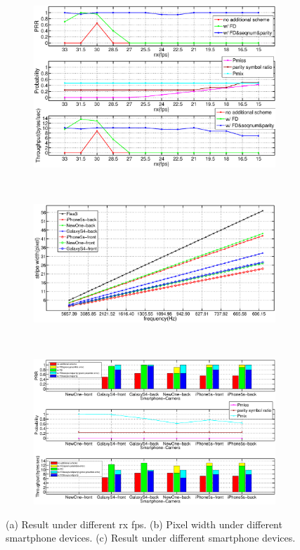 \begin{figure}[!t]
	\begin{subfigure}[h]{0.3\textwidth}
	  \includegraphics[width=\textwidth]{fig/exp1_new.eps}
	  \caption{}
	  \label{fig:exp1_1}
	\end{subfigure}
	~
	\begin{subfigure}[h]{0.35\textwidth}
	  \includegraphics[width=\textwidth]{fig/exp2_tr_new.eps}
	  \caption{}
  	  \label{fig:exp2_tr}
	\end{subfigure}
	~
	\begin{subfigure}[h]{0.3\textwidth}
  	  \includegraphics[width=\textwidth]{fig/exp2_refine.eps}
      \caption{}
      \label{fig:exp2_1}
    \end{subfigure}
    \caption{(a) Result under different rx fps. (b) Pixel width under different smartphone devices. (c) Result under different smartphone devices.}
    \label{}
\end{figure}
